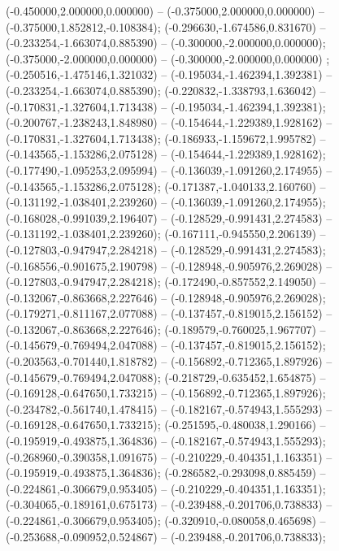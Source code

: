  (-0.450000,2.000000,0.000000) -- (-0.375000,2.000000,0.000000) -- (-0.375000,1.852812,-0.108384);
 (-0.296630,-1.674586,0.831670) -- (-0.233254,-1.663074,0.885390) -- (-0.300000,-2.000000,0.000000);
 (-0.375000,-2.000000,0.000000) -- (-0.300000,-2.000000,0.000000) ;
 (-0.250516,-1.475146,1.321032) -- (-0.195034,-1.462394,1.392381) -- (-0.233254,-1.663074,0.885390);
 (-0.220832,-1.338793,1.636042) -- (-0.170831,-1.327604,1.713438) -- (-0.195034,-1.462394,1.392381);
 (-0.200767,-1.238243,1.848980) -- (-0.154644,-1.229389,1.928162) -- (-0.170831,-1.327604,1.713438);
 (-0.186933,-1.159672,1.995782) -- (-0.143565,-1.153286,2.075128) -- (-0.154644,-1.229389,1.928162);
 (-0.177490,-1.095253,2.095994) -- (-0.136039,-1.091260,2.174955) -- (-0.143565,-1.153286,2.075128);
 (-0.171387,-1.040133,2.160760) -- (-0.131192,-1.038401,2.239260) -- (-0.136039,-1.091260,2.174955);
 (-0.168028,-0.991039,2.196407) -- (-0.128529,-0.991431,2.274583) -- (-0.131192,-1.038401,2.239260);
 (-0.167111,-0.945550,2.206139) -- (-0.127803,-0.947947,2.284218) -- (-0.128529,-0.991431,2.274583);
 (-0.168556,-0.901675,2.190798) -- (-0.128948,-0.905976,2.269028) -- (-0.127803,-0.947947,2.284218);
 (-0.172490,-0.857552,2.149050) -- (-0.132067,-0.863668,2.227646) -- (-0.128948,-0.905976,2.269028);
 (-0.179271,-0.811167,2.077088) -- (-0.137457,-0.819015,2.156152) -- (-0.132067,-0.863668,2.227646);
 (-0.189579,-0.760025,1.967707) -- (-0.145679,-0.769494,2.047088) -- (-0.137457,-0.819015,2.156152);
 (-0.203563,-0.701440,1.818782) -- (-0.156892,-0.712365,1.897926) -- (-0.145679,-0.769494,2.047088);
 (-0.218729,-0.635452,1.654875) -- (-0.169128,-0.647650,1.733215) -- (-0.156892,-0.712365,1.897926);
 (-0.234782,-0.561740,1.478415) -- (-0.182167,-0.574943,1.555293) -- (-0.169128,-0.647650,1.733215);
 (-0.251595,-0.480038,1.290166) -- (-0.195919,-0.493875,1.364836) -- (-0.182167,-0.574943,1.555293);
 (-0.268960,-0.390358,1.091675) -- (-0.210229,-0.404351,1.163351) -- (-0.195919,-0.493875,1.364836);
 (-0.286582,-0.293098,0.885459) -- (-0.224861,-0.306679,0.953405) -- (-0.210229,-0.404351,1.163351);
 (-0.304065,-0.189161,0.675173) -- (-0.239488,-0.201706,0.738833) -- (-0.224861,-0.306679,0.953405);
 (-0.320910,-0.080058,0.465698) -- (-0.253688,-0.090952,0.524867) -- (-0.239488,-0.201706,0.738833);
